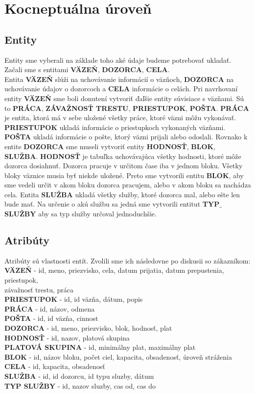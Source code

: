 \documentclass[slovak, 12pt, Times New Roman]{article}
\begin{document}
	\section{Kocneptuálna úroveň}
		\subsection{Entity}
			Entity sme vyberali na základe toho aké údaje budeme potrebovať ukladať. Začali sme s entitami \textbf{VÄZEŇ}, \textbf{DOZORCA}, \textbf{CELA}.\\ Entita \textbf{VÄZEŇ} slúži na uchovávanie informácií o väzňoch, \textbf{DOZORCA} na uchovávanie údajov o dozorcoch a \textbf{CELA} informácie o celách. Pri navrhovaní entity \textbf{VÄZEŇ} sme boli donutení vytvoriť ďaľšie entity súvisiace s väzňami. Sú to \textbf{PRÁCA}, \textbf{ZÁVAŽNOSŤ TRESTU}, \textbf{PRIESTUPOK}, \textbf{POŠTA}. \textbf{PRÁCA} je entita, ktorá má v sebe uložené všetky práce, ktoré väzni môžu vykonávať. \textbf{PRIESTUPOK} ukladá informácie o priestupkoch vykonaných väzňami. \textbf{POŠTA} ukladá informácie o pošte, ktorý väzni prijali alebo odoslali. Rovnako k entite \textbf{DOZORCA} sme museli vytvoriť entity \textbf{HODNOSŤ}, \textbf{BLOK}, \textbf{SLUŽBA}. \textbf{HODNOSŤ} je tabuľka uchovávajúca všetky hodnosti, ktoré môže dozorca dosiahnuť. Dozorca pracuje v určitom čase iba v jednom bloku. Všetky bloky väznice musia byť niekde uložené. Preto sme vytvorili entitu \textbf{BLOK}, aby sme vedeli určit v akom bloku dozorca pracujem, alebo v akom bloku sa nachádza cela. Entita \textbf{SLUŽBA} ukladá všetky služby, ktoré dozorca mal, alebo ešte len bude mať. Na určenie o akú službu sa jedná sme vytvorili entitut \textbf{TYP$\_$SLUŽBY} aby sa typ služby určoval jednoduchšie.
		\subsection{Atribúty}
			Atribúty sú vlastnosti entít. Zvolili sme ich následovne po diskusii so zákazníkom: \\
			\textbf{VÄZEŇ} - id, meno, priezvisko, cela, datum prijatia, datum prepustenia, priestupok, \\ závažnosť trestu, práca\\
			\textbf{PRIESTUPOK} - id, id väzňa, dátum, popis\\
			\textbf{PRÁCA} - id, názov, odmena\\
			\textbf{POŠTA} - id, id väzňa, cinnost\\
			\textbf{DOZORCA} - id, meno, priezvisko, blok, hodnosť, plat \\
			\textbf{HODNOSŤ} - id, nazov, platová skupina\\
			\textbf{PLATOVÁ SKUPINA} - id, minimálny plat, maximálny plat\\
			\textbf{BLOK} - id, názov bloku, počet ciel, kapacita, obsadenosť, úroveň stráženia\\
			\textbf{CELA} - id, kapacita, obsadenosť\\
			\textbf{SLUŽBA} - id, id dozorcu, id typu sluzby, dátum\\
			\textbf{TYP SLUŽBY} - id, nazov sluzby, cas od, cas do\\
\end{document}
